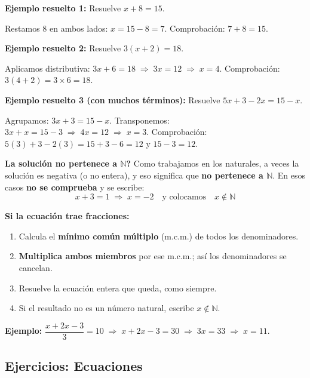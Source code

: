 \documentclass[12pt, letterpaper]{article}
\newcommand{\N}{\mathbb{N}}
\begin{document}
\noindent\textbf{Ejemplo resuelto 1:} Resuelve $x + 8 = 15$.

Restamos $8$ en ambos lados: $x = 15 - 8 = 7$. \quad Comprobación: $7 + 8 = 15$. \checkmark

\noindent\textbf{Ejemplo resuelto 2:} Resuelve $3(x + 2) = 18$.

Aplicamos distributiva: $3x + 6 = 18 \;\Rightarrow\; 3x = 12 \;\Rightarrow\; x = 4$. \quad Comprobación: $3(4 + 2) = 3 \times 6 = 18$. \checkmark

\noindent\textbf{Ejemplo resuelto 3 (con muchos términos):} Resuelve $5x + 3 - 2x = 15 - x$.

Agrupamos: $3x + 3 = 15 - x$. Transponemos: $3x + x = 15 - 3 \;\Rightarrow\; 4x = 12 \;\Rightarrow\; x = 3$. \quad Comprobación: $5(3) + 3 - 2(3) = 15 + 3 - 6 = 12$ y $15 - 3 = 12$. \checkmark

\begin{cuadroadvertencia}
  \textbf{\textquestiondown La solución no pertenece a $\N$?} Como trabajamos en los naturales, a veces la solución es negativa (o no entera), y eso significa que \textbf{no pertenece a $\N$}. En esos casos \textbf{no se comprueba} y se escribe:
  \[
    x + 3 = 1 \;\Rightarrow\; x = -2 \quad\text{y colocamos}\quad x \notin \N
  \]
\end{cuadroadvertencia}

\begin{cuadropasos}
  \textbf{Si la ecuación trae fracciones:}
  \begin{enumerate}
    \item Calcula el \textbf{mínimo común múltiplo} (m.c.m.) de todos los denominadores.
    \item \textbf{Multiplica ambos miembros} por ese m.c.m.; así los denominadores se cancelan.
    \item Resuelve la ecuación entera que queda, como siempre.
    \item Si el resultado no es un número natural, escribe $x \notin \N$.
  \end{enumerate}
  \textbf{Ejemplo:} $\dfrac{x + 2x - 3}{3} = 10 \;\Rightarrow\; x + 2x - 3 = 30 \;\Rightarrow\; 3x = 33 \;\Rightarrow\; x = 11$.
\end{cuadropasos}

\subsection{Ejercicios: Ecuaciones}
\end{document}

